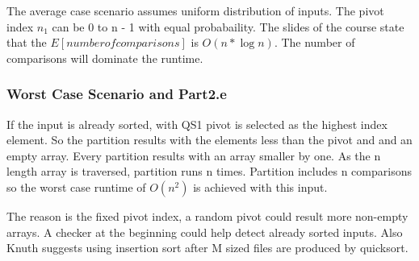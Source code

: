 The average case scenario assumes uniform distribution of inputs. The pivot index \(n_1\) can be 0 to n - 1 with equal probabaility. The slides of the course state that the \(E[ number of comparisons]\) is \(O(n*\log n ) \). The number of comparisons will dominate the runtime.

\subsubsection{Worst Case Scenario and Part2.e}
If the input is already sorted, with QS1 pivot is selected as the highest index element. So the partition results with the elements less than the pivot and and an empty array. Every partition results with an array smaller by one. As the n length  array is traversed, partition runs n times. Partition includes n comparisons so the worst case runtime of \(O(n^2) \) is achieved with this input.



The reason is the fixed pivot index, a random pivot could result more non-empty arrays. A checker at the beginning could help detect already sorted inputs. Also Knuth suggests using insertion sort after M sized files are produced by quicksort.
